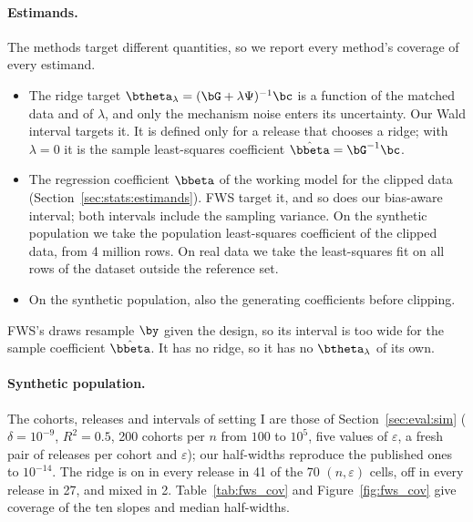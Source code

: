 \paragraph{Estimands.} The methods target different quantities, so we report every method's coverage of every estimand.
\begin{itemize}[noitemsep]
  \item The ridge target $\btheta_\lambda = (\bG + \lambda\Psi)^{-1}\bc$ is a function of the matched data and of $\lambda$, and only the mechanism noise enters its uncertainty. Our Wald interval targets it. It is defined only for a release that chooses a ridge; with $\lambda = 0$ it is the sample least-squares coefficient $\hat\bbeta = \bG^{-1}\bc$.
  \item The regression coefficient $\bbeta$ of the working model for the clipped data (Section~\ref{sec:stats:estimands}). FWS target it, and so does our bias-aware interval; both intervals include the sampling variance. On the synthetic population we take the population least-squares coefficient of the clipped data, from 4 million rows. On real data we take the least-squares fit on all rows of the dataset outside the reference set.
  \item On the synthetic population, also the generating coefficients before clipping.
\end{itemize}
FWS's draws resample $\by$ given the design, so its interval is too wide for the sample coefficient $\hat\bbeta$. It has no ridge, so it has no $\btheta_\lambda$ of its own.

\paragraph{Synthetic population.} The cohorts, releases and intervals of setting I are those of Section~\ref{sec:eval:sim} ($\delta = 10^{-9}$, $R^2 = 0.5$, 200 cohorts per $n$ from $100$ to $10^5$, five values of $\varepsilon$, a fresh pair of releases per cohort and $\varepsilon$); our half-widths reproduce the published ones to $10^{-14}$. The ridge is on in every release in 41 of the 70 $(n, \varepsilon)$ cells, off in every release in 27, and mixed in 2. Table~\ref{tab:fws_cov} and Figure~\ref{fig:fws_cov} give coverage of the ten slopes and median half-widths.

